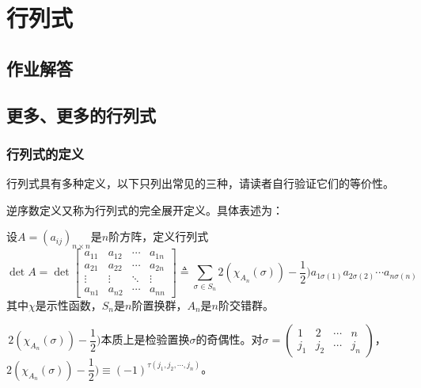 \chapter{行列式}

    \section{作业解答}

    \section{更多、更多的行列式}

        \subsection{行列式的定义}

            行列式具有多种定义，以下只列出常见的三种，请读者自行验证它们的等价性。

            逆序数定义又称为行列式的完全展开定义。具体表述为：

            \begin{definition}[逆序数定义]
                \label{def_det:inverse_order}
                设$A=(a_{ij})_{n\times n}$是$n$阶方阵，定义行列式
                \begin{equation*}
                    \det A =\det
                    \begin{bmatrix}
                        a_{11} & a_{12} & \cdots & a_{1n} \\
                        a_{21} & a_{22} & \cdots & a_{2n} \\
                        \vdots & \vdots & \ddots & \vdots \\
                        a_{n1} & a_{n2} & \cdots & a_{nn}
                    \end{bmatrix}
                    \triangleq\sum_{\sigma\in S_n}2(\chi_{A_n}(\sigma))-\frac12)a_{1\sigma(1)}a_{2\sigma(2)}\cdots a_{n\sigma(n)}
                \end{equation*}
                其中$\chi$是示性函数，$S_n$是$n$阶置换群，$A_n$是$n$阶交错群。
            \end{definition}

            \begin{note}
                \,$2(\chi_{A_n}(\sigma))-\dfrac12)$本质上是检验置换$\sigma$的奇偶性。对$\sigma=\begin{pmatrix}1 & 2 & \cdots & n \\ j_1 & j_2 & \cdots & j_n \end{pmatrix}$，$2(\chi_{A_n}(\sigma))-\dfrac12)\equiv (-1)^{\tau(j_1,j_2,\cdots,j_n)}$。
            \end{note}

